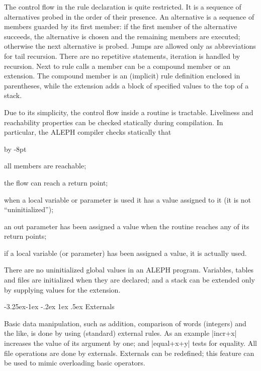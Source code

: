 \documentclass{article}
\makeatletter
\newcommand\A{\textsf{ALEPH}}
\newcommand\g[1]{\textsf{#1}}
\renewenvironment{itemize}{\begin{list}{}{%
\advance\leftmargin by -8pt%
\setlength\itemsep{0ex plus 0.2ex}%
\setlength\partopsep{3pt}%
\setlength\topsep{2pt plus 2pt}%
\setlength\parsep{0pt plus 2pt}%
}}{\end{list}}
\renewcommand\subsection{%
\@startsection{subsection}{2}{\z@}%
   {-3.25ex\@plus -1ex \@minus -.2ex}%
   {1ex \@plus .5ex}%
   {\normalfont\normalsize\bfseries}}
\makeatother
\begin{document}
The control flow in the rule declaration is quite restricted. It is a
sequence of alternatives probed in the order of their presence. An
alternative is a sequence of members guarded by its first member: if the
first member of the alternative succeeds, the alternative is chosen and the
remaining members are executed; otherwise the next alternative is probed.
Jumps are allowed only as abbreviations for tail recursion. There are no
repetitive statements, iteration is handled by recursion. Next to rule
calls a member can be a \g{compound member} or an \g{extension}. The
compound member is an (implicit) rule definition enclosed in parentheses,
while the extension adds a block of specified values to the top of a stack.

Due to its simplicity, the control flow inside a routine is tractable.
Liveliness and reachability properties can be checked statically during
compilation. In particular, the \A{} compiler checks statically that
\begin{itemize}
\item[$\bullet$] all members are reachable;
\item[$\bullet$] the flow can reach a return point;
\item[$\bullet$] when a local variable or parameter is used it has a value
  assigned to it (it is not ``uninitialized'');
\item[$\bullet$] an out parameter has been assigned a value when the routine
 reaches any of its return points;
\item[$\bullet$] if a local variable (or parameter) has been assigned a
value, it is actually used.
\end{itemize}

There are no uninitialized global values in an \A{} program. Variables,
tables and files are initialized when they are declared; and a stack can be
extended only by supplying values for the extension.

\subsection{Externals}

Basic data manipulation, such as addition, comparison of words (integers)
and the like, is done by using (standard) external rules. As an example
\pp|incr+x| increases the value of its argument by one; and \pp|equal+x+y|
tests for equality. All file operations are done by externals. Externals can
be redefined; this feature can be used to mimic overloading basic operators.
\end{document}
